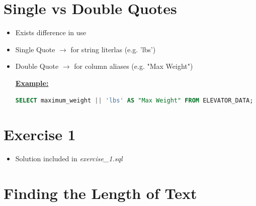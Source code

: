 \documentclass[12pt]{article}
\begin{document}
\bigskip

\section{Single vs Double Quotes}

\bigskip

\begin{itemize}
    \item Exists difference in use
    \item Single Quote $\to$ for string literlas (e.g. 'lbs')
    \item Double Quote $\to$ for column aliases (e.g. "Max Weight")

    \bigskip

    \underline{\textbf{Example:}}

    \bigskip

    \begin{lstlisting}[language=SQL]
    SELECT maximum_weight || 'lbs' AS "Max Weight" FROM ELEVATOR_DATA;
    \end{lstlisting}

\end{itemize}

\bigskip

\section{Exercise 1}

\bigskip

\begin{itemize}
    \item Solution included in \textit{exercise\_1.sql}
\end{itemize}

\bigskip

\section{Finding the Length of Text}

\bigskip
\end{document}
